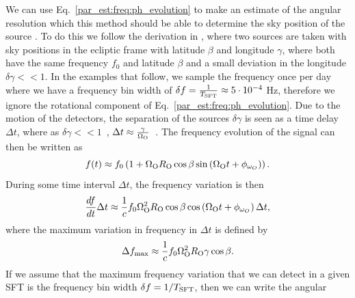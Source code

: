 We can use Eq.~\ref{par_est:freq:ph_evolution} to make an estimate of the
angular resolution which this method should be able to determine the sky
position of the source .  To do this we follow the derivation in \citep{astone2014MethodAllsky},
where two sources are taken with sky positions in the ecliptic frame with
latitude $\beta$ and longitude $\gamma$, where both have the same frequency
$f_0 $ and latitude $\beta$ and a small deviation in the longitude $\delta
\gamma << 1$.  In the examples that follow, we sample the frequency once per
day where we have a frequency bin width of $\delta f = \frac{1}{T_{\rm{SFT}}}
\approx 5 \cdot 10^{-4}$ Hz, therefore we ignore the rotational component of
Eq.~\ref{par_est:freq:ph_evolution}.  Due to the motion of the detectors, the
separation of the sources $\delta \gamma$ is seen as a time delay $\Delta t$,
where as $\delta \gamma << 1$~, $\Delta t
\approx \frac{\gamma}{\Omega_{\rm{O}}}$~. The frequency evolution of the signal can then be
written as
%
\begin{equation}
    f(t) \approx f_0 \left( 1 + \Omega_{\rm{O}} R_{\rm{O}} \cos \beta \sin \left( \Omega_{\mathrm{O}} t + \phi_{\omega_{O}}  \right) \right).
\end{equation}
%
 During some time interval $\Delta t$, the frequency variation is then
%
\begin{equation}
    \frac{df}{dt} \Delta t \approx \frac{1}{c} f_0 \Omega_{\rm{O}}^2 R_{\rm{O}} \cos{\beta} \cos \left( \Omega_{\mathrm{O}} t + \phi_{\omega_{O}}  \right) \Delta t, 
\end{equation}
%
 where the maximum variation in
frequency in $\Delta t$ is defined by
%
\begin{equation}
    \Delta f_{\rm{max}} \approx \frac{1}{c} f_0 \Omega_{\rm{O}}^2 R_{\rm{O}} \gamma \cos{\beta}. 
\end{equation}
%
 If we assume that
the maximum frequency variation that we can detect in a given \gls{SFT} is the
frequency bin width $\delta f = 1/T_{\rm{SFT}}$, then we can write the angular
